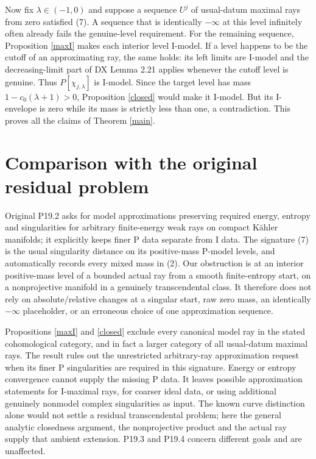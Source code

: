 \documentclass[11pt]{article}
\begin{document}
Now fix $\lambda\in(-1,0)$ and suppose a sequence $U^j$ of
usual-datum maximal rays from zero satisfied (7). A sequence that
is identically $-\infty$ at this level infinitely often already
fails the genuine-level requirement. For the remaining sequence,
Proposition \ref{maxI} makes each interior level I-model. If a
level happens to be the cutoff of an approximating ray, the same
holds: its left limits are I-model and the decreasing-limit
part of DX Lemma 2.21 applies whenever the cutoff level is
genuine. Thus $P[\chi_{j,\lambda}]$ is I-model.
Since the target level has mass $1-c_0(\lambda+1)>0$,
Proposition \ref{closed} would make it I-model. But its
I-envelope is zero while its mass is strictly less than one,
a contradiction. This proves all the claims of Theorem \ref{main}.

\section{Comparison with the original residual problem}
Original P19.2 asks for model approximations preserving required
energy, entropy and singularities for arbitrary finite-energy weak
rays on compact K\"ahler manifolds; it explicitly keeps finer P
data separate from I data. The signature (7) is the usual singularity
distance on its positive-mass P-model levels, and automatically
records every mixed mass in (2). Our obstruction is at an interior
positive-mass level of a bounded actual ray from a smooth finite-entropy
start, on a nonprojective manifold in a genuinely transcendental
class. It therefore does not rely on absolute/relative changes at a
singular start, raw zero mass, an identically $-\infty$ placeholder,
or an erroneous choice of one approximation sequence.

Propositions \ref{maxI} and \ref{closed} exclude every canonical
model ray in the stated cohomological category, and in fact a larger
category of all usual-datum maximal rays. The result rules out the
unrestricted arbitrary-ray approximation request when its finer
P singularities are required in this signature. Energy or entropy
convergence cannot supply the missing P data. It leaves possible
approximation statements for I-maximal rays, for coarser ideal data,
or using additional genuinely nonmodel complex singularities as
input. The known curve distinction alone would not settle a residual
transcendental problem; here the general analytic closedness argument,
the nonprojective product and the actual ray supply that ambient
extension. P19.3 and P19.4 concern different goals and are unaffected.
\end{document}
